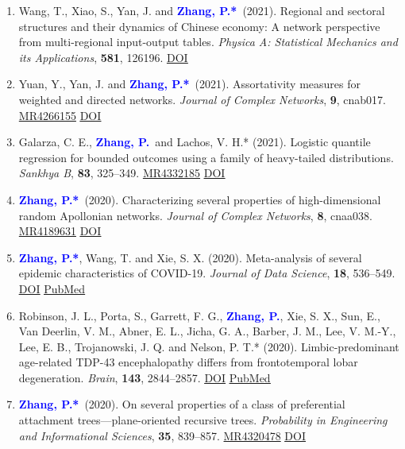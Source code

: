 \documentclass{res}
\def\MR#1{\href{http://www.ams.org/mathscinet-getitem?mr=#1}{MR#1}}
\newcommand{\PZ}{\textbf{\textcolor{blue}{Zhang, P.*}}}
\newcommand{\PZnot}{\textbf{\textcolor{blue}{Zhang, P.}}}
\begin{document}
\begin{resume}
\begin{enumerate}
	\item {\sc Wang, T., Xiao, S., Yan, J.} and \PZ\ 
	(2021). Regional and sectoral structures and their dynamics of
	Chinese economy: A network perspective from
	multi-regional input-output tables. {\em Physica A: Statistical 
	Mechanics and its Applications}, {\bf 581}, 126196.
	\href{https://doi.org/10.1016/j.physa.2021.126196}
	{\underline{DOI}}
	
	\item {\sc Yuan, Y., Yan, J.} and \PZ\ (2021). 
	Assortativity measures for weighted and directed
	networks. \emph{Journal of Complex Networks}, {\bf 9}, cnab017. 
	\MR{4266155} \href{https://doi.org/10.1093/comnet/cnab017}
	{\underline{DOI}}
	
	\item {\sc Galarza, C. E.}, \PZnot\	and {\sc Lachos, V. H.*} 
	(2021). Logistic quantile regression for bounded outcomes using 
	a family of heavy-tailed distributions. {\em Sankhya B}, {\bf 
	83}, 325--349. \MR{4332185} 
	\href{https://doi.org/10.1007/s13571-020-00231-0}
	{\underline{DOI}}
	
	\item \PZ\ (2020). Characterizing several properties of 
	high-dimensional random Apollonian networks. {\em 
	Journal of Complex Networks}, {\bf 8}, cnaa038. \MR{4189631}
	\href{https://doi.org/10.1093/comnet/cnaa038}
	{\underline{DOI}}
	
	\item \PZ, {\sc Wang, T.} and {\sc Xie, S. X.} 
	(2020). Meta-analysis of several epidemic characteristics of 
	COVID-19. {\em Journal of Data Science}, {\bf 18}, 536--549. 
	\href{https://doi.org/10.6339/JDS.202007_18(3).0019}
	{\underline{DOI}}
	\href{https://pubmed.ncbi.nlm.nih.gov/33088292}
	{\underline{PubMed}}
	
	\item {\sc Robinson, J. L., Porta, S., Garrett, F. G.}, 
	\PZnot, {\sc Xie, S. X., Sun, E., 
	Van Deerlin, V. M., Abner, 
	E. L., Jicha, G. A., Barber, J. M., Lee, V. M.-Y., Lee, E. B., 
	Trojanowski, J. Q.} and {\sc Nelson, P. T.*} (2020). 
	Limbic-predominant age-related TDP-43 encephalopathy differs 
	from frontotemporal lobar degeneration. {\em Brain}, {\bf 143}, 
	2844--2857. 
	\href{https://doi.org/10.1093/brain/awaa219}
	{\underline{DOI}}
	\href{https://pubmed.ncbi.nlm.nih.gov/32830216}
	{\underline{PubMed}}
		
	\item \PZ\ (2020). On several properties of a 
	class of preferential attachment trees---plane-oriented 
	recursive trees. {\em Probability in Engineering and 
	Informational Sciences}, {\bf 35}, 839--857. \MR{4320478}
	\href{https://doi.org/10.1017/S0269964820000261}
	{\underline{DOI}}
	

\end{enumerate}
\end{resume}
\end{document}

